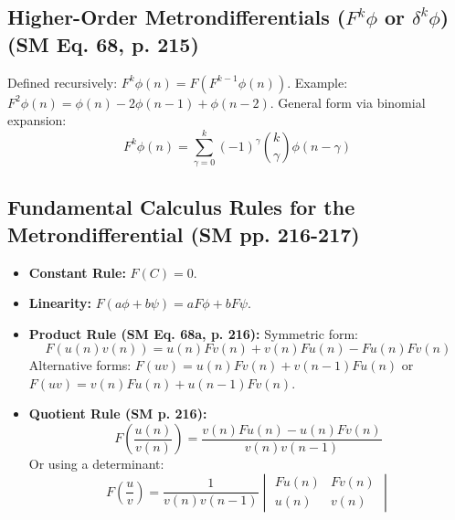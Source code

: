 \documentclass[
    12pt,              %
    a4paper,           %
    headings=normal,   %
    twoside=true,      %
    BCOR=8mm,          %
]{scrbook}
\newcommand{\metronenziffer}{n}
\begin{document}
\subsection{Higher-Order Metrondifferentials (\(F^k\phi\) or \(\delta^k\phi\)) (SM Eq. 68, p. 215)}
\label{sec:ch10_2_3_higher_order_metrondiff}
Defined recursively: \(F^k\phi(\metronenziffer) = F(F^{k-1}\phi(\metronenziffer))\). Example: \(F^2\phi(\metronenziffer) = \phi(\metronenziffer) - 2\phi(\metronenziffer-1) + \phi(\metronenziffer-2)\). General form via binomial expansion:
\begin{equation} \label{eq:original_kth_metrondifferential} %
F^k\phi(\metronenziffer) = \sum_{\gamma=0}^k (-1)^\gamma \binom{k}{\gamma} \phi(\metronenziffer-\gamma)
\end{equation}

\subsection{Fundamental Calculus Rules for the Metrondifferential (SM pp. 216-217)}
\label{sec:ch10_2_4_calculus_rules_metrondiff}
\begin{itemize}
    \item   \textbf{Constant Rule:} \(F(C) = 0\).
    \item   \textbf{Linearity:} \(F(a\phi + b\psi) = aF\phi + bF\psi\).
    \item   \textbf{Product Rule (SM Eq. 68a, p. 216):} Symmetric form:
        \begin{equation} \label{eq:original_product_rule_metrondifferential} %
        F(u(\metronenziffer)v(\metronenziffer)) = u(\metronenziffer)Fv(\metronenziffer) + v(\metronenziffer)Fu(\metronenziffer) - Fu(\metronenziffer)Fv(\metronenziffer)
        \end{equation}
        Alternative forms: \(F(uv) = u(n)Fv(n) + v(n-1)Fu(n)\) or \(F(uv) = v(n)Fu(n) + u(n-1)Fv(n)\).
    \item   \textbf{Quotient Rule (SM p. 216):}
        \[ F\left(\frac{u(\metronenziffer)}{v(\metronenziffer)}\right) = \frac{v(\metronenziffer)Fu(\metronenziffer) - u(\metronenziffer)Fv(\metronenziffer)}{v(\metronenziffer)v(\metronenziffer-1)} \]
        Or using a determinant:
        \[ F\left(\frac{u}{v}\right) = \frac{1}{v(\metronenziffer)v(\metronenziffer-1)} \begin{vmatrix} Fu(\metronenziffer) & Fv(\metronenziffer) \\ u(\metronenziffer) & v(\metronenziffer) \end{vmatrix} \]
\end{itemize}
\end{document}
